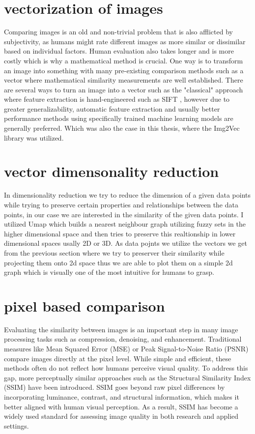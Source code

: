 \documentclass[
  a4paper,  %
  twoside,  %
  bibliography=totoc,
  headsepline,
  cleardoublepage=empty,
  parskip=half,
  draft=false
]{scrbook}
\begin{document}
\section{vectorization of images}
Comparing images is an old and non-trivial problem that is also afflicted by subjectivity, as humans might rate different images as more similar or dissimilar based on individual factors. Human evaluation also takes longer and is more costly which is why a mathematical method is crucial. 
One way is to transform an image into something with many pre-existing comparison methods such as a vector where mathematical similarity measurements are well established. There are several ways to turn an image into a vector such as the "classical" approach where feature extraction is hand-engineered such as SIFT \cite{inbook}, however due to greater generalizability, automatic feature extraction and usually better performance methods using specifically trained machine learning models are generally preferred. Which was also the case in this thesis, where the Img2Vec library \cite{patel2019img2vec} was utilized.

\section{vector dimensonality reduction}
In dimensionality reduction we try to reduce the dimension of a given data points while trying to preserve certain properties and relationships between the data points, in our case we are interested in the similarity of the given data points. I utilized Umap which builds a nearest neighbour graph utilizing fuzzy sets in the higher dimensional space and then tries to preserve this realtionship in lower dimensional spaces usally 2D or 3D. 
As data pojnts we utilize the vectors we get from the previous section where we try to preserver their similarity while projecting them onto 2d space thus we are able to plot them on a simple 2d graph which is visually one of the most intuitive for humans to grasp. 

\section{pixel based comparison}
Evaluating the similarity between images is an important step in many image processing tasks such as compression, denoising, and enhancement. Traditional measures like Mean Squared Error (MSE) or Peak Signal-to-Noise Ratio (PSNR) compare images directly at the pixel level. While simple and efficient, these methods often do not reflect how humans perceive visual quality. To address this gap, more perceptually similar approaches such as the Structural Similarity Index (SSIM) \cite{ssim} have been introduced. SSIM goes beyond raw pixel differences by incorporating luminance, contrast, and structural information, which makes it better aligned with human visual perception. As a result, SSIM has become a widely used standard for assessing image quality in both research and applied settings.
\end{document}

